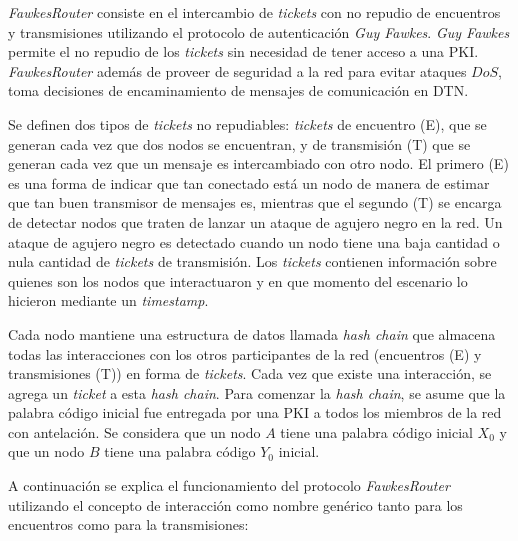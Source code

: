 
\textit{FawkesRouter} consiste en el intercambio de \textit{tickets} con no
repudio de encuentros y transmisiones utilizando el protocolo de autenticación
\textit{Guy Fawkes}. \textit{Guy Fawkes} permite el no repudio de los
\textit{tickets} sin necesidad de tener acceso a una PKI.  \textit{FawkesRouter}
además de proveer de seguridad a la red para evitar ataques $DoS$, toma
decisiones de encaminamiento de mensajes de comunicación en DTN.

Se definen dos tipos de \textit{tickets} no repudiables: \textit{tickets} de
encuentro (E), que se generan cada vez que dos nodos se encuentran, y de
transmisión (T) que se generan cada vez que un mensaje es intercambiado con otro
nodo. El primero (E) es una forma de indicar que tan conectado está un nodo de
manera de estimar que tan buen transmisor de mensajes es, mientras que el
segundo (T) se encarga de detectar nodos que traten de lanzar un ataque de
agujero negro en la red. Un ataque de agujero negro es detectado cuando un nodo
tiene una baja cantidad o nula cantidad de \textit{tickets} de transmisión. Los
\textit{tickets} contienen información sobre quienes son los nodos que
interactuaron y en que momento del escenario lo hicieron mediante un
\textit{timestamp}.


Cada nodo mantiene una estructura de datos llamada \textit{hash chain} que
almacena todas las interacciones con los otros participantes de la red
(encuentros (E) y transmisiones (T)) en forma de \textit{tickets}. Cada vez que
existe una interacción, se agrega un \textit{ticket} a esta \textit{hash chain}.
Para comenzar la \textit{hash chain}, se asume que la palabra código inicial fue
entregada por una PKI a todos los miembros de la red con antelación. Se
considera que un nodo $A$ tiene una palabra código inicial $X_0$ y que un nodo
$B$ tiene una palabra código $Y_0$ inicial.


A continuación se explica el funcionamiento del protocolo \textit{FawkesRouter}
utilizando el concepto de interacción como nombre genérico tanto para los
encuentros como para la transmisiones:


